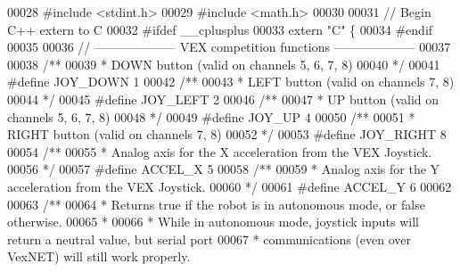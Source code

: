 \begin{DoxyCode}
00028 \textcolor{preprocessor}{#}\textcolor{preprocessor}{include} \textcolor{preprocessor}{<}\textcolor{preprocessor}{stdint}\textcolor{preprocessor}{.}\textcolor{preprocessor}{h}\textcolor{preprocessor}{>}
00029 \textcolor{preprocessor}{#}\textcolor{preprocessor}{include} \textcolor{preprocessor}{<}\textcolor{preprocessor}{math}\textcolor{preprocessor}{.}\textcolor{preprocessor}{h}\textcolor{preprocessor}{>}
00030 
00031 \textcolor{comment}{// Begin C++ extern to C}
00032 \textcolor{preprocessor}{#}\textcolor{preprocessor}{ifdef} \_\_cplusplus
00033 \textcolor{keyword}{extern} \textcolor{stringliteral}{"C"} \{
00034 \textcolor{preprocessor}{#}\textcolor{preprocessor}{endif}
00035 
00036 \textcolor{comment}{// -------------------- VEX competition functions --------------------}
00037 
00038 \textcolor{comment}{/**}
00039 \textcolor{comment}{ * DOWN button (valid on channels 5, 6, 7, 8)}
00040 \textcolor{comment}{ */}
00041 \textcolor{preprocessor}{#}\textcolor{preprocessor}{define} \textcolor{preprocessor}{JOY\_DOWN} 1
00042 \textcolor{comment}{/**}
00043 \textcolor{comment}{ * LEFT button (valid on channels 7, 8)}
00044 \textcolor{comment}{ */}
00045 \textcolor{preprocessor}{#}\textcolor{preprocessor}{define} \textcolor{preprocessor}{JOY\_LEFT} 2
00046 \textcolor{comment}{/**}
00047 \textcolor{comment}{ * UP button (valid on channels 5, 6, 7, 8)}
00048 \textcolor{comment}{ */}
00049 \textcolor{preprocessor}{#}\textcolor{preprocessor}{define} \textcolor{preprocessor}{JOY\_UP} 4
00050 \textcolor{comment}{/**}
00051 \textcolor{comment}{ * RIGHT button (valid on channels 7, 8)}
00052 \textcolor{comment}{ */}
00053 \textcolor{preprocessor}{#}\textcolor{preprocessor}{define} \textcolor{preprocessor}{JOY\_RIGHT} 8
00054 \textcolor{comment}{/**}
00055 \textcolor{comment}{ * Analog axis for the X acceleration from the VEX Joystick.}
00056 \textcolor{comment}{ */}
00057 \textcolor{preprocessor}{#}\textcolor{preprocessor}{define} \textcolor{preprocessor}{ACCEL\_X} 5
00058 \textcolor{comment}{/**}
00059 \textcolor{comment}{ * Analog axis for the Y acceleration from the VEX Joystick.}
00060 \textcolor{comment}{ */}
00061 \textcolor{preprocessor}{#}\textcolor{preprocessor}{define} \textcolor{preprocessor}{ACCEL\_Y} 6
00062 
00063 \textcolor{comment}{/**}
00064 \textcolor{comment}{ * Returns true if the robot is in autonomous mode, or false otherwise.}
00065 \textcolor{comment}{ *}
00066 \textcolor{comment}{ * While in autonomous mode, joystick inputs will return a neutral value, but serial port}
00067 \textcolor{comment}{ * communications (even over VexNET) will still work properly.}

\end{DoxyCode}
